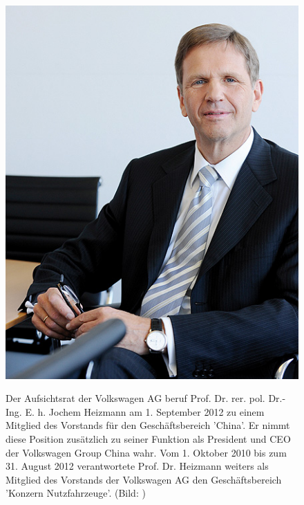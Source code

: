 \documentclass[12pt]{article}
\begin{document}
\begin{figure}[!h]
	\centering
	\begin{minipage}[h]{0.20\textwidth}
		\centering
		\includegraphics[width=1.0\textwidth]{images/JochemHeizmann.jpg}
		\label{fig:vorstandvw2}
	\end{minipage}
	\begin{minipage}[h]{0.10\textwidth}
		\hspace{1cm} 
	\end{minipage}
	\begin{minipage}[h]{0.65\textwidth}
		Der Aufsichtsrat der Volkswagen AG beruf Prof. Dr. rer. pol. Dr.-Ing. E. h. Jochem Heizmann am 1. September 2012 zu einem Mitglied des Vorstands für den Geschäftsbereich 'China'. Er nimmt diese Position zusätzlich zu seiner Funktion als President und CEO der Volkswagen Group China wahr. Vom 1. Oktober 2010 bis zum 31. August 2012 verantwortete Prof. Dr. Heizmann weiters als Mitglied des Vorstands der Volkswagen AG den Geschäftsbereich 'Konzern Nutzfahrzeuge'. (Bild: \cite{jhpic} )
	\end{minipage}
\end{figure}
\end{document}
